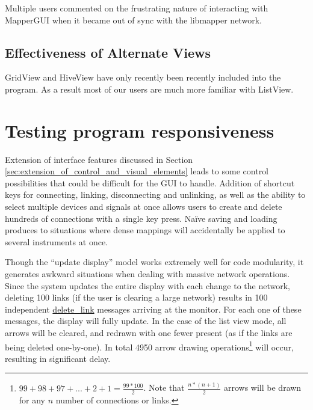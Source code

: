 Multiple users commented on the frustrating nature of interacting with MapperGUI when it became out of sync with the libmapper network. 
	

	\subsection{Effectiveness of Alternate Views} %
	\label{sub:effectiveness_of_alternate_views}

GridView and HiveView have only recently been recently included into the program. As a result most of our users are much more familiar with ListView. 
	
	

\section{Testing program responsiveness} %
\label{sec:testing_program_responsiveness}

Extension of interface features discussed in Section \ref{sec:extension_of_control_and_visual_elements} leads to some control possibilities that could be difficult for the GUI to handle. Addition of shortcut keys for connecting, linking, disconnecting and unlinking, as well as the ability to select multiple devices and signals at once allows users to create and delete hundreds of connections with a single key press. Na\"{i}ve saving and loading produces to situations where dense mappings will accidentally be applied to several instruments at once.

Though the ``update display'' model works extremely well for code modularity, it generates awkward situations when dealing with massive network operations. Since the system updates the entire display with each change to the network, deleting 100 links (if the user is clearing a large network) results in 100 independent \url{delete_link} messages arriving at the monitor. For each one of these messages, the display will fully update. In the case of the list view mode, all arrows will be cleared, and redrawn with one fewer present (as if the links are being deleted one-by-one). In total 4950 arrow drawing operations\footnote{$99 + 98 + 97 + ... + 2 + 1 = \frac{99*100}{2}$. Note that $\frac{n*(n+1)}{2}$ arrows will be drawn for any $n$ number of connections or links.} will occur, resulting in significant delay. 

